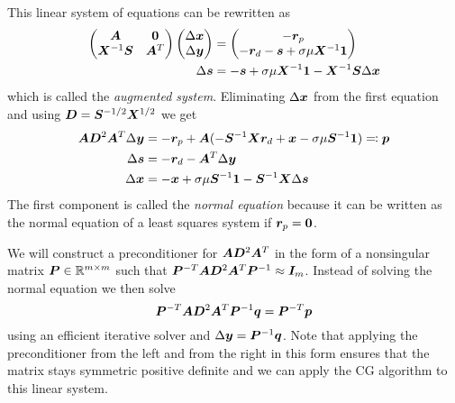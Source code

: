 This linear system of equations can be rewritten as
\begin{subequations} \label{eqn:augmented-system}
  \begin{align}
    \begin{pmatrix}
      \bm{A}              & \bm{0} \\
      \bm{X}^{-1} \bm{S} & \bm{A}^T \\
    \end{pmatrix}
    \begin{pmatrix}
      \Delta\bm{x} \\
      \Delta\bm{y}
    \end{pmatrix}
    &=
    \begin{pmatrix}
      -\bm{r}_p \\
      -\bm{r}_d -\bm{s} + \sigma \mu \bm{X}^{-1} \bm{1}
    \end{pmatrix} \\
    \Delta\bm{s} &= -\bm{s} + \sigma \mu \bm{X}^{-1} \bm{1} - \bm{X}^{-1} \bm{S} \Delta\bm{x}
  \end{align}
\end{subequations}
which is called the \emph{augmented system}.
Eliminating \(\Delta\bm{x}\) from the first equation and using \(\bm{D} = \bm{S}^{-1/2} \bm{X}^{1/2}\) we get
\begin{subequations} \label{eqn:normal-equation-system}
  \begin{align}
    \bm{A} \bm{D}^2 \bm{A}^T \Delta\bm{y} &= -\bm{r}_p + \bm{A} ( -\bm{S}^{-1} \bm{X} \bm{r}_d + \bm{x} - \sigma \mu \bm{S}^{-1} \bm{1} ) \eqqcolon \bm{p} \label{eqn:normal-equation} \\
    \Delta\bm{s} &= -\bm{r}_d - \bm{A}^T \Delta\bm{y} \label{eqn:s-from-normal} \\
    \Delta\bm{x} &= -\bm{x} + \sigma \mu \bm{S}^{-1} \bm{1} - \bm{S}^{-1} \bm{X} \Delta\bm{s} \label{eqn:x-from-normal}
  \end{align}
\end{subequations}
The first component is called the \emph{normal equation} because it can be written as the normal equation of a least squares system if \(\bm{r}_p = \bm{0}\).

We will construct a preconditioner for \(\bm{A} \bm{D}^2 \bm{A}^T\) in the form of a nonsingular matrix \(\bm{P} \in \mathbb{R}^{m \times m}\) such that
\( \bm{P}^{-T} \bm{A} \bm{D}^2 \bm{A}^T \bm{P}^{-1} \approx \bm{I}_m \).
Instead of solving the normal equation we then solve
\begin{equation} \label{eqn:preconditioned-system}
 \bm{P}^{-T} \bm{A} \bm{D}^2 \bm{A}^T \bm{P}^{-1} \bm{q} = \bm{P}^{-T} \bm{p}
\end{equation}
using an efficient iterative solver and \(\Delta\bm{y} = \bm{P}^{-1} \bm{q}\).
Note that applying the preconditioner from the left and from the right in this form ensures that the matrix stays symmetric positive definite and we can apply the CG algorithm to this linear system.

